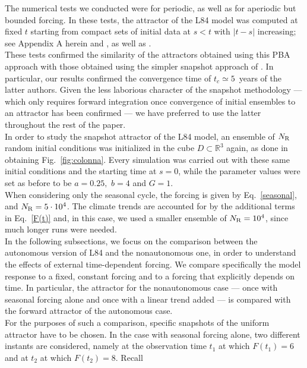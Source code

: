 \documentclass[%
 aip, cha,
 amsmath,amssymb,
 reprint,%
author-year,%
]{revtex4-1}
\newcommand{\0}{\mathbf 0}
\begin{document}
The numerical tests we conducted were for periodic, as well as for aperiodic but bounded forcing. In these tests, the attractor of the L84 model was computed at fixed $t$ starting from compact sets of initial data at $s < t$ with $|t - s|$ increasing; see Appendix A herein and  \citet[Fig.~4]{charo}, as well as  \citet[Fig.~7]{ghil_PBA}. \\
These tests confirmed the similarity of the attractors obtained using this PBA approach with those obtained using the simpler snapshot approach of \cite{drotos}. In particular, our results confirmed the convergence time of $t_c \simeq 5$~years of the latter authors. Given the less laborious character of the snapshot methodology — which only requires forward integration once convergence of initial ensembles to an attractor has been confirmed — we have preferred to use the latter throughout the rest of the paper. \\
In order to study the snapshot attractor of the L84 model, an ensemble of  
$N_{\rm R}$ random initial conditions was initialized in the cube $D \subset \mathbb R^3$ again, as done in obtaining Fig.~\ref{fig:colonna}. Every simulation was carried out with these same initial conditions and the starting time at $s = 0$, while the parameter values were set as before to be $a=0.25,$ $b=4$ and $G=1$. \\
When considering only the seasonal cycle, the forcing is given by Eq.~\eqref{seasonal}, and $N_{\rm R} = 5 \cdot 10^{4}$. The climate trends are accounted for by the additional terms in Eq.~\eqref{F(t)} and, in this case, we used a smaller ensemble of $N_{\rm R} = 10^{4}$, since much longer runs were needed. \\
In the following subsections, we focus on the comparison between the autonomous version of L84 and the nonautonomous one, in order to understand the effects of external time-dependent forcing. We compare specifically the model response to a fixed, constant forcing and to a forcing that explicitly depends on time. 
In particular, the attractor for the nonautonomous case --- once with seasonal forcing alone and once with a linear trend added --- is compared with the forward attractor of the autonomous case. \\
For the purposes of such a comparison, specific snapshots of the uniform attractor have to 
be chosen. In the case with seasonal forcing alone, two different instants are considered, namely at the observation time $t_1$ at which $F(t_1) = 6$ and at $t_2$ at which $F(t_2) = 8$. Recall 
\end{document}
